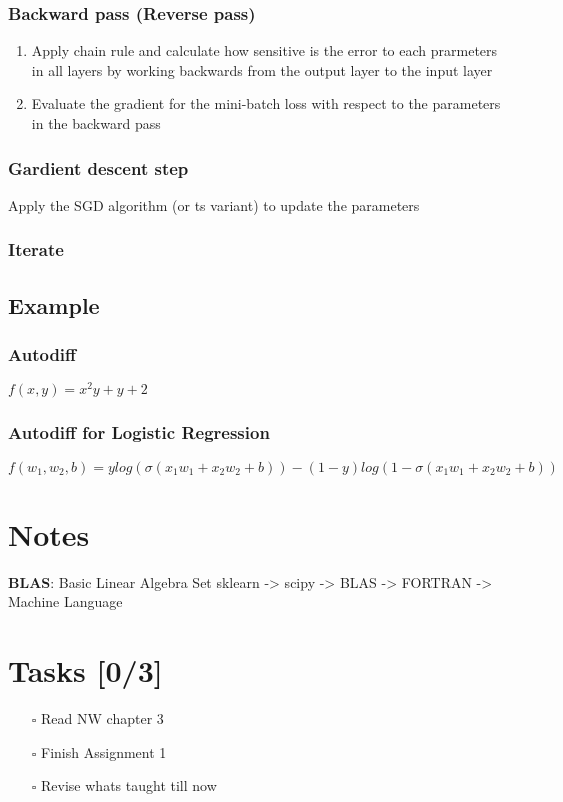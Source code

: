 \documentclass[11pt]{article}
\begin{document}
\subsubsection{Backward pass (Reverse pass)}
\label{sec:orgd9a3135}
\begin{enumerate}
\item Apply chain rule and calculate how sensitive is the error to each prarmeters in all layers by working backwards from the output layer to the input layer
\item Evaluate the gradient for the mini-batch loss with respect to the parameters in the backward pass
\end{enumerate}
\subsubsection{Gardient descent step}
\label{sec:org790a5f5}
Apply the SGD algorithm (or ts variant) to update the parameters
\subsubsection{Iterate}
\label{sec:org8685164}

\subsection{Example}
\label{sec:org6fd2914}
\subsubsection{Autodiff}
\label{sec:org1c24f75}
\(f(x, y) = x^2y + y + 2\)

\subsubsection{Autodiff for Logistic Regression}
\label{sec:org2528614}
\(f(w_1, w_2, b) = ylog(\sigma (x_1w_1 + x_2w_2 + b)) - (1-y)log(1 - \sigma (x_1w_1 + x_2w_2 + b))\)

\section{Notes}
\label{sec:org05ea5fd}
\textbf{BLAS}: Basic Linear Algebra Set
sklearn -> scipy -> BLAS -> FORTRAN -> Machine Language

\section{Tasks [0/3]}
\label{sec:orgbf2498f}
\begin{itemize}
\item[{$\square$}] Read NW chapter 3
\item[{$\square$}] Finish Assignment 1
\item[{$\square$}] Revise whats taught till now
\end{itemize}
\end{document}
